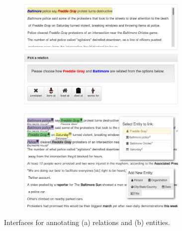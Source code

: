 \begin{figure}[!th]
  \centering
  \begin{subfigure}{\textwidth}
  \centering
    \includegraphics[width=0.9\textwidth]{figures/interface/relation-interface}
    \caption{\label{fig:kbpo:relation-interface}}
  \end{subfigure}

  \begin{subfigure}{\textwidth}
  \centering
    \includegraphics[width=0.9\textwidth]{figures/interface/extraction-interface}
    \caption{\label{fig:kbpo:entity-interface}}
  \end{subfigure}

  \caption[Annotation interfaces for KBP]{\label{fig:kbpo:interfaces}
  Interfaces for annotating (a) relations and (b) entities.
  }
\end{figure}

